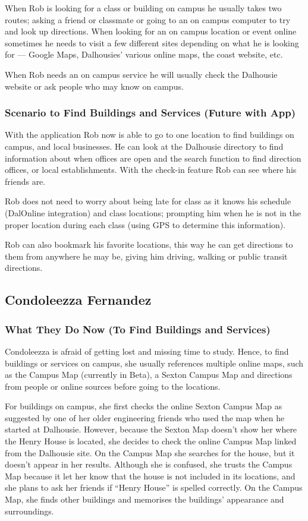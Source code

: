 \documentclass{article}
\begin{document}
When Rob is looking for a class or building on campus he usually takes two
routes; asking a friend or classmate or going to an on campus computer to try
and look up directions. When looking for an on campus location or event online
sometimes he needs to visit a few different sites depending on what he is
looking for --- Google Maps, Dalhousies' various online maps, the coast website,
etc. 

When Rob needs an on campus service he will usually check the Dalhousie website
or ask people who may know on campus.

\subsubsection{Scenario to Find Buildings and Services (Future with App)}
With the application Rob now is able to go to one location to find buildings on
campus, and local businesses. He can look at the Dalhousie directory to find
information about when offices are open and the search function to find
direction offices, or local establishments. With the check-in feature Rob can
see where his friends are.

Rob does not need to worry about being late for class as it knows his schedule
(DalOnline integration) and class locations; prompting him when he is not in the
proper location during each class (using GPS to determine this information).

Rob can also bookmark his favorite locations, this way he can get directions to
them from anywhere he may be, giving him driving, walking or public transit
directions.

\subsection{Condoleezza Fernandez}
\subsubsection{What They Do Now (To Find Buildings and Services)}

Condoleezza is afraid of getting lost and missing time to study. Hence, to find
buildings or services on campus, she usually references multiple online maps,
such as the Campus Map (currently in Beta), a Sexton Campus Map and directions
from people or online sources before going to the locations.

For buildings on campus, she first checks the online Sexton Campus Map as
suggested by one of her older engineering friends who used the map when he
started at Dalhousie. However, because the Sexton Map doesn’t show her where the
Henry House is located, she decides to check the online Campus Map linked from the
Dalhousie site. On the Campus Map she searches for the house, but it doesn’t
appear in her results. Although she is confused, she trusts the Campus Map because
it let her know that the house is not included in its locations, and she plans
to ask her friends if “Henry House” is spelled correctly. On the Campus Map, she
finds other buildings and memorises the buildings’ appearance and surroundings.
\end{document}
